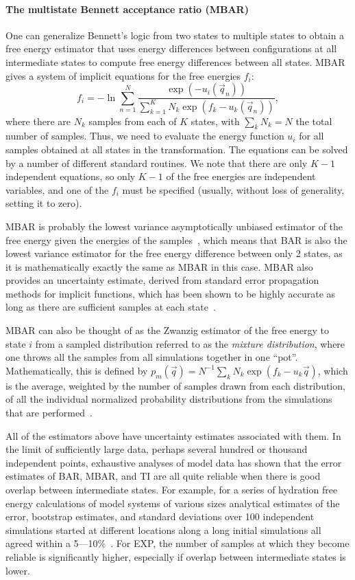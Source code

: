 \documentclass[9pt,bestpractices]{livecoms}
\begin{document}
\paragraph{The multistate Bennett acceptance ratio (MBAR)}
One can generalize Bennett's logic from two states to multiple states to obtain a free energy estimator that uses energy differences between configurations at all intermediate states to compute free energy differences between all states. MBAR gives a system of implicit equations for the free energies $f_i$:
\begin{equation}
f_i = - \ln \sum_{n=1}^{N} \frac{\exp(-u_i(\vec{q}_n))}{\sum_{k=1}^K N_k \exp(f_k-u_k(\vec{q}_n))},
\end{equation}
where there are $N_k$ samples from each of $K$ states, with $\sum_k N_k=N$ the total number of samples. Thus, we need to evaluate the energy function $u_i$ for all samples obtained at all states in the transformation. The equations can be solved by a number of different standard routines. We note that there are only $K-1$ independent equations, so only $K-1$ of the free energies are independent variables, and one of the $f_i$ must be specified (usually, without loss of generality, setting it to zero).

MBAR is probably the lowest variance asymptotically unbiased estimator of the free energy given the energies of the samples~\cite{tan2004likelihood}, which means that BAR is also the lowest variance estimator for the free energy difference between only 2 states, as it is mathematically exactly the same as MBAR in this case. MBAR also provides an uncertainty estimate, derived from standard error propagation methods for implicit functions, which has been shown to be highly accurate as long as there are sufficient samples at each state~\cite{paliwal2011benchmark}.

MBAR can also be thought of as the Zwanzig estimator of the free energy to state $i$ from a sampled distribution referred to as the \textit{mixture distribution}, where one throws all the samples from all simulations together in one ``pot''. Mathematically, this is defined by $p_m(\vec{q}) = N^{-1} \sum_k N_k \exp(f_k-u_k\vec{q})$, which is the average, weighted by the number of samples drawn from each distribution, of all the individual normalized probability distributions from the simulations that are performed~\cite{shirts2017reweighting}.

All of the estimators above have uncertainty estimates associated with them.  In the limit of sufficiently large data, perhaps several hundred or thousand independent points, exhaustive analyses of model data has shown that the error estimates of BAR, MBAR, and TI are all quite reliable when there is good overlap between intermediate states. For example, for a series of hydration free energy calculations of model systems of various sizes analytical estimates of the error, bootstrap estimates, and standard deviations over 100 independent simulations started at different locations along a long initial simulations all agreed within a 5---10\%~\cite{paliwal2011benchmark}. For EXP, the number of samples at which they become reliable is significantly higher, especially if overlap between intermediate states is lower. 
\end{document}
